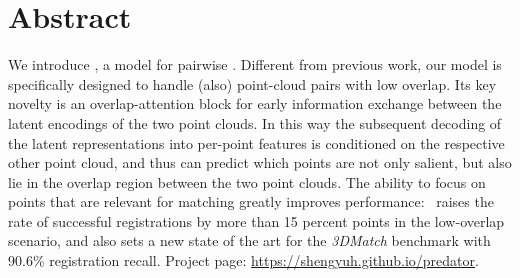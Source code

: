 \section*{Abstract}
We introduce \acro, a model for pairwise \acroexplain. Different from previous work, our model is specifically designed to handle (also) point-cloud pairs with low overlap.  Its key novelty is an  overlap-attention block for early information exchange between the latent encodings of the two point clouds. In this way the subsequent decoding of the latent representations into per-point features is conditioned on the respective other point cloud, and thus can predict which points are not only salient, but also lie in the overlap region between the two point clouds. The ability to focus on points that are relevant for matching greatly improves performance: \acro\ raises the rate of successful registrations by more than 15 percent points in the low-overlap scenario, and also sets a new state of the art for the \emph{3DMatch} benchmark with 90.6\% registration recall. Project page: \url{https://shengyuh.github.io/predator}.